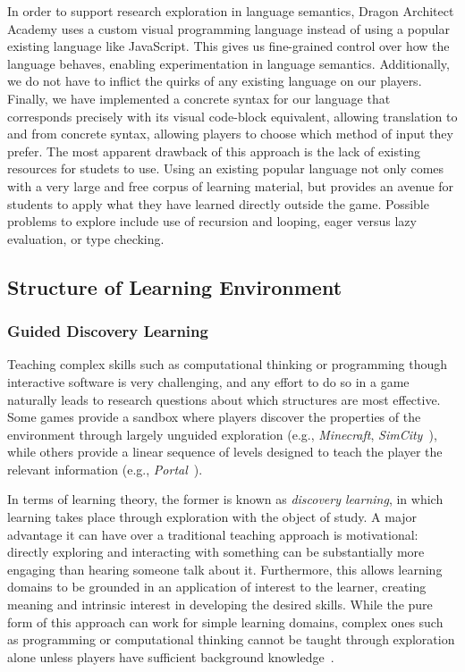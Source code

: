 \documentclass{sig-alternate}
\newcommand{\gametitle}{{\color{RoyalPurple} Dragon Architect Academy}}
\begin{document}
In order to support research exploration in language semantics, \gametitle{} uses a custom visual programming language instead of using a popular existing language like JavaScript. 
This gives us fine-grained control over how the language behaves, enabling experimentation in language semantics.
Additionally, we do not have to inflict the quirks of any existing language on our players. 
Finally, we have implemented a concrete syntax for our language that corresponds precisely with its visual code-block equivalent, allowing translation to and from concrete syntax, allowing players to choose which method of input they prefer.  
The most apparent drawback of this approach is the lack of existing resources for studets to use.
Using an existing popular language not only comes with a very large and free corpus of learning material, but provides an avenue for students to apply what they have learned directly outside the game.
Possible problems to explore include use of recursion and looping, eager versus lazy evaluation, or type checking.

\subsection{Structure of Learning Environment}

\subsubsection{Guided Discovery Learning}
\label{sec:guided_discovery_theory}

Teaching complex skills such as computational thinking or programming though interactive software is very challenging, and any effort to do so in a game naturally leads to research questions about which structures are most effective.
Some games provide a sandbox where players discover the properties of the environment through largely unguided exploration (e.g., \emph{Minecraft}, \emph{SimCity}~\cite{simcity}), while others provide a linear sequence of levels designed to teach the player the relevant information (e.g., \emph{Portal}~\cite{portal}). 

In terms of learning theory, the former is known as \emph{discovery learning}, in which learning takes place through exploration with the object of study.
A major advantage it can have over a traditional teaching approach is motivational: directly exploring and interacting with something can be substantially more engaging than hearing someone talk about it.
Furthermore, this allows learning domains to be grounded in an application of interest to the learner, creating meaning and intrinsic interest in developing the desired skills.
While the pure form of this approach can work for simple learning domains, complex ones such as programming or computational thinking cannot be taught through exploration alone unless players have sufficient background knowledge~\cite{kirschner2006minimal}. 
\end{document}
